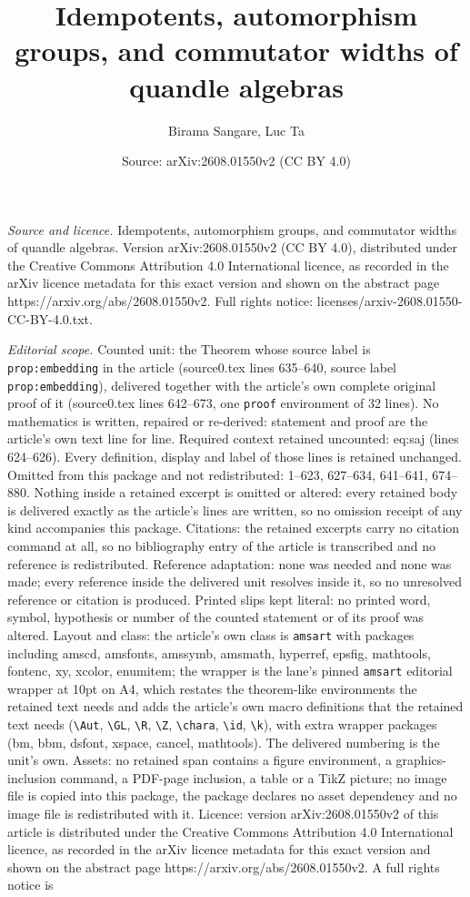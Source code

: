 \documentclass[10pt,a4paper]{amsart}
\title[Idempotents, automorphism groups, and commutator widths of q]{Idempotents, automorphism groups, and commutator widths of quandle algebras}
\author{Birama Sangare, Luc Ta}
\date{Source: arXiv:2608.01550v2 (CC BY 4.0)}
\begin{document}
\maketitle

\noindent\emph{Source and licence.} Idempotents, automorphism groups, and commutator widths of quandle algebras. Version arXiv:2608.01550v2 (CC BY 4.0), distributed under the Creative Commons Attribution 4.0 International licence, as recorded in the arXiv licence metadata for this exact version and shown on the abstract page https://arxiv.org/abs/2608.01550v2. Full rights notice: licenses/arxiv-2608.01550-CC-BY-4.0.txt.\par\smallskip

\noindent\textit{Editorial scope.} Counted unit: the Theorem whose source label is \texttt{prop:embedding} in the article (source0.tex lines 635--640, source label \texttt{prop:embedding}), delivered together with the article's own complete original proof of it (source0.tex lines 642--673, one \texttt{proof} environment of 32 lines). No mathematics is written, repaired or re-derived: statement and proof are the article's own text line for line. Required context retained uncounted: eq:saj (lines 624--626). Every definition, display and label of those lines is retained unchanged. Omitted from this package and not redistributed: 1--623, 627--634, 641--641, 674--880. Nothing inside a retained excerpt is omitted or altered: every retained body is delivered exactly as the article's lines are written, so no omission receipt of any kind accompanies this package. Citations: the retained excerpts carry no citation command at all, so no bibliography entry of the article is transcribed and no reference is redistributed. Reference adaptation: none was needed and none was made; every reference inside the delivered unit resolves inside it, so no unresolved reference or citation is produced. Printed slips kept literal: no printed word, symbol, hypothesis or number of the counted statement or of its proof was altered. Layout and class: the article's own class is \texttt{amsart} with packages including amscd, amsfonts, amssymb, amsmath, hyperref, epsfig, mathtools, fontenc, xy, xcolor, enumitem; the wrapper is the lane's pinned \texttt{amsart} editorial wrapper at 10pt on A4, which restates the theorem-like environments the retained text needs and adds the article's own macro definitions that the retained text needs (\texttt{\textbackslash Aut}, \texttt{\textbackslash GL}, \texttt{\textbackslash R}, \texttt{\textbackslash Z}, \texttt{\textbackslash chara}, \texttt{\textbackslash id}, \texttt{\textbackslash k}), with extra wrapper packages (bm, bbm, dsfont, xspace, cancel, mathtools). The delivered numbering is the unit's own. Assets: no retained span contains a figure environment, a graphics-inclusion command, a PDF-page inclusion, a table or a TikZ picture; no image file is copied into this package, the package declares no asset dependency and no image file is redistributed with it. Licence: version arXiv:2608.01550v2 of this article is distributed under the Creative Commons Attribution 4.0 International licence, as recorded in the arXiv licence metadata for this exact version and shown on the abstract page https://arxiv.org/abs/2608.01550v2. A full rights notice is 
\end{document}

